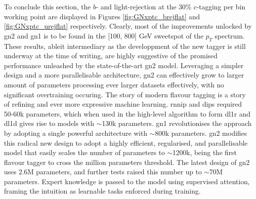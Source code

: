 To conclude this section, the $b$- and light-rejection at the 30\% $c$-tagging per bin working point are displayed in Figures \ref{fig:GNxptc_brejflat} and \ref{fig:GNxptc_urejflat} respectively. Clearly, most of the improvements unlocked by \gls{gn2} and \gls{gn1} is to be found in the [100, 800] GeV sweetspot of the $p_T$ spectrum. \\

These results, ableit intermediary as the developpment of the new tagger is still underway at the time of writing, are highly suggestive of the promised performance unleashed by the state-of-the-art \gls{gn2} model. Leveraging a simpler design and a more parallelisable architecture, \gls{gn2} can effectively grow to larger amount of parameters processing ever larger datasets effectively, with no significant overtraining occuring. The story of modern flavour tagging is a story of refining and ever more expressive machine learning. \gls{rnnip} and \gls{dips} required 50-60k parameters, which when used in the high-level algorithm to form \gls{dl1r} and \gls{dl1d} gives rise to models with $\sim$130k parameters. \gls{gn1} revolutionises the approach by adopting a single powerful architecture with $\sim$800k parameters. \gls{gn2} modifies this radical new design to adopt a highly efficient, regularised, and parallelisable model that easily scales the number of parameters to $\sim$1200k, being the first flavour tagger to cross the million parameters threshold. The latest design of \gls{gn2} uses 2.6M parameters, and further tests raised this number up to $\sim$70M parameters. Expert knowledge is passed to the model using supervised attention, framing the intuition as learnable tasks enforced during training. 
